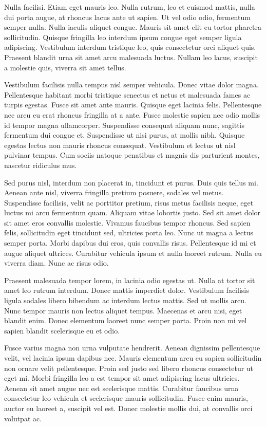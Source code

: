 \documentclass[12pt, a4paper]{article}
\begin{document}
Nulla facilisi. Etiam eget mauris leo. Nulla rutrum, leo et euismod mattis,
nulla dui porta augue, at rhoncus lacus ante ut sapien. Ut vel odio odio,
fermentum semper nulla. Nulla iaculis aliquet congue. Mauris sit amet elit eu
tortor pharetra sollicitudin. Quisque fringilla leo interdum ipsum congue eget
semper ligula adipiscing. Vestibulum interdum tristique leo, quis consectetur
orci aliquet quis. Praesent blandit urna sit amet arcu malesuada luctus. Nullam
leo lacus, suscipit a molestie quis, viverra sit amet tellus.

Vestibulum facilisis nulla tempus nisl semper vehicula. Donec vitae dolor
magna. Pellentesque habitant morbi tristique senectus et netus et malesuada
fames ac turpis egestas. Fusce sit amet ante mauris. Quisque eget lacinia
felis. Pellentesque nec arcu eu erat rhoncus fringilla at a ante. Fusce
molestie sapien nec odio mollis id tempor magna ullamcorper. Suspendisse
consequat aliquam nunc, sagittis fermentum dui congue et. Suspendisse ut nisi
purus, at mollis nibh. Quisque egestas lectus non mauris rhoncus consequat.
Vestibulum et lectus ut nisl pulvinar tempus. Cum sociis natoque penatibus et
magnis dis parturient montes, nascetur ridiculus mus.

Sed purus nisl, interdum non placerat in, tincidunt et purus. Duis quis tellus
mi. Aenean ante nisl, viverra fringilla pretium posuere, sodales vel metus.
Suspendisse facilisis, velit ac porttitor pretium, risus metus facilisis neque,
eget luctus mi arcu fermentum quam. Aliquam vitae lobortis justo. Sed sit amet
dolor sit amet eros convallis molestie. Vivamus faucibus tempor rhoncus. Sed
sapien felis, sollicitudin eget tincidunt sed, ultricies porta leo. Nunc ut
magna a lectus semper porta. Morbi dapibus dui eros, quis convallis risus.
Pellentesque id mi et augue aliquet ultrices. Curabitur vehicula ipsum et nulla
laoreet rutrum. Nulla eu viverra diam. Nunc ac risus odio.

Praesent malesuada tempor lorem, in lacinia odio egestas ut. Nulla at tortor
sit amet leo rutrum interdum. Donec mattis imperdiet dolor. Vestibulum
facilisis ligula sodales libero bibendum ac interdum lectus mattis. Sed ut
mollis arcu. Nunc tempor mauris non lectus aliquet tempus. Maecenas et arcu
nisi, eget blandit enim. Donec elementum laoreet nunc semper porta. Proin non
mi vel sapien blandit scelerisque eu et odio.

Fusce varius magna non urna vulputate hendrerit. Aenean dignissim pellentesque
velit, vel lacinia ipsum dapibus nec. Mauris elementum arcu eu sapien
sollicitudin non ornare velit pellentesque. Proin sed justo sed libero rhoncus
consectetur ut eget mi. Morbi fringilla leo a est tempor sit amet adipiscing
lacus ultricies. Aenean sit amet augue nec est scelerisque mattis. Curabitur
faucibus urna consectetur leo vehicula et scelerisque mauris sollicitudin.
Fusce enim mauris, auctor eu laoreet a, suscipit vel est. Donec molestie mollis
dui, at convallis orci volutpat ac.
\end{document}
